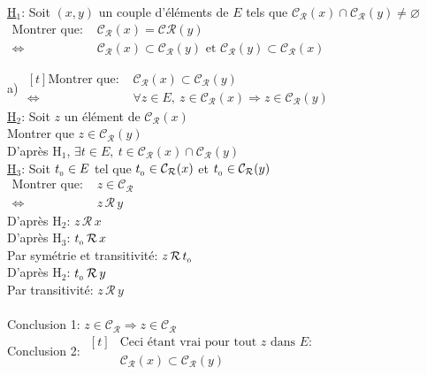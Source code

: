 \documentclass[12pt,twoside,a4paper]{article}
\begin{document}
\begin{preuve}
\begin{liste}
					\underline{H$_1$}: Soit $(x,y)$ un couple d'\'el\'ements de $E$ tels que $\mathcal{C_R}(x)\cap \mathcal{C_R}(y)\neq\varnothing$\\
					$\begin{aligned}\text{Montrer que: }&\mathcal{C_R}(x)=\mathcal{C}\mathcal{R}(y)\\
					\iff&\mathcal{C_R}(x)\subset \mathcal{C_R}(y)\text{ et }\mathcal{C_R}(y)\subset \mathcal{C_R}(x)\end{aligned}$
					\begin{liste}
						\item[a)] $\begin{aligned}[t]\text{Montrer que: }&\mathcal{C_R}(x)\subset \mathcal{C_R}(y)\\
							\iff&\forall z\in E,\ z\in \mathcal{C_R}(x)\Rightarrow z\in \mathcal{C_R}(y)\end{aligned}$\\
							\underline{H$_2$}: Soit $z$ un \'el\'ement de $\mathcal{C_R}(x)$\\
							Montrer que $z\in \mathcal{C_R}(y)$\\
							D'apr\`es H$_1$, $\exists t\in E,\ t\in \mathcal{C_R}(x)\cap \mathcal{C_R}(y)$\\
							\underline{H$_3$}: Soit $t_{_{0}}\in E$ tel que $t_{_{0}}\in \mathcal{C_R}(x)$ et $t_{_{0}}\in\mathcal{C_R}(y)$\\
							$\begin{aligned}\text{Montrer que: }&z\in \mathcal{C_R}\\
							\iff&z\,\mathcal{R}\,y\end{aligned}$\\
							D'apr\`es H$_2$: $z\,\mathcal{R}\,x$\\
							D'apr\`es H$_3$: $t_{_{0}}\,\mathcal{R}\,x$\\
							Par sym\'etrie et transitivit\'e: $z\,\mathcal{R}\,t_{_{0}}$\\
							D'apr\`es H$_2$: $t_{_{0}}\,\mathcal{R}\,y$\\
							Par transitivit\'e: $z\,\mathcal{R}\,y$\\
							\\
							Conclusion 1: $z\in\mathcal{C_R}\Rightarrow z\in\mathcal{C_R}$\\
							Conclusion 2: $\begin{aligned}[t]&\text{Ceci \'etant vrai pour tout }z\text{ dans }E\text{:}\\
							&\mathcal{C_R}(x)\subset\mathcal{C_R}(y)\end{aligned}$

\end{liste}
\end{liste}
\end{preuve}
\end{document}
